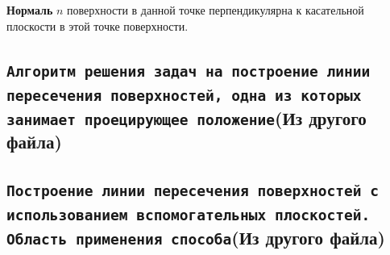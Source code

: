 {\bf Нормаль} $n$ поверхности в данной точке перпендикулярна к касательной плоскости в этой точке поверхности.




\newpage
\subsection{\texttt{Алгоритм решения задач на построение линии пересечения поверхностей, одна из которых занимает проецирующее положение}(Из другого файла)}


\newpage
\subsection{\texttt{Построение линии пересечения поверхностей с использованием вспомогательных плоскостей. Область применения способа}(Из другого файла)}


